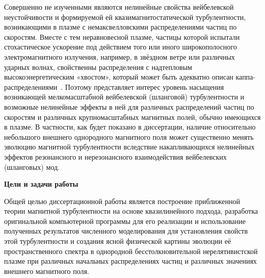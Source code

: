 Совершенно не изученными являются нелинейные свойства вейбелевской неустойчивости и формируемой ей квазимагнитостатической турбулентности, возникающими в плазме с немаксвелловскими распределениями частиц по скоростям.
Вместе с тем неравновесной плазме, частицы которой испытали стохастическое ускорение под действием того или иного широкополосного электромагнитного излучения, например, в звёздном ветре или различных ударных волнах, свойственны распределения с надтепловым высокоэнергетическим «хвостом», который может быть адекватно описан каппа-распределениями~\cite{Feldman1975,Lazar2010,Livadiotis2021}. Поэтому представляет интерес уровень насыщения возникающей мелкомасштабной вейбелевской (шланговой) турбулентности и возможные нелинейные эффекты в ней для различных распределений частиц по скоростям и различных крупномасштабных магнитных полей, обычно имеющихся в плазме. В частности, как будет показано в диссертации, наличие относительно небольшого внешнего однородного магнитного поля может существенно менять эволюцию магнитной турбулентности вследствие накапливающихся нелинейных эффектов резонансного и нерезонансного взаимодействия вейбелевских (шланговых) мод. 

{\bfseries Цели и задачи работы}

Общей целью диссертационной работы является построение приближенной теории магнитной турбулентности на основе квазилинейного подхода, разработка оригинальной компьютерной программы для его реализации и использование полученных результатов численного моделирования для установления свойств этой турбулентности и создания ясной физической картины эволюции её пространственного спектра в однородной бесстолкновительной нерелятивистской плазме при различных начальных распределениях частиц и различных значениях внешнего магнитного поля.

